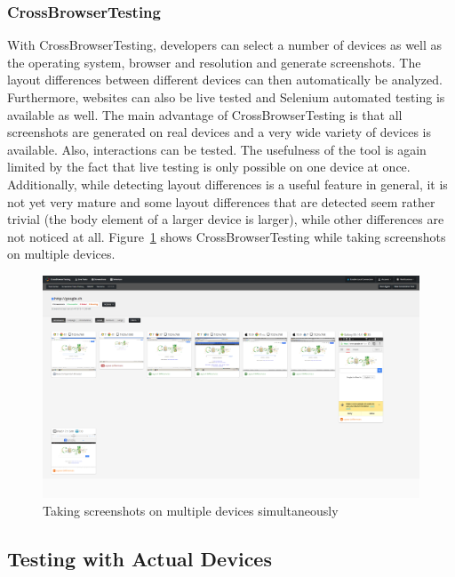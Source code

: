 \subsubsection{CrossBrowserTesting}

With CrossBrowserTesting, developers can select a number of devices as well as the operating system, browser and resolution and generate screenshots. The layout differences between different devices can then automatically be analyzed. Furthermore, websites can also be live tested and Selenium automated testing is available as well. The main advantage of CrossBrowserTesting is that all screenshots are generated on real devices and a very wide variety of devices is available. Also, interactions can be tested. The usefulness of the tool is again limited by the fact that live testing is only possible on one device at once. Additionally, while detecting layout differences is a useful feature in general, it is not yet very mature and some layout differences that are detected seem rather trivial (the body element of a larger device is larger), while other differences are not noticed at all. Figure~\ref{fig:crossbrowsertesting} shows CrossBrowserTesting while taking screenshots on multiple devices.

\begin{figure}[H]
  \centering
    \includegraphics[width=1.0\textwidth]{images/relatedwork/cross_browser_testing.png}
	\caption[Screenshot: CrossBrowserTesting]{Taking screenshots on multiple devices simultaneously}
	\label{fig:crossbrowsertesting}
\end{figure}

\subsection{Testing with Actual Devices}

